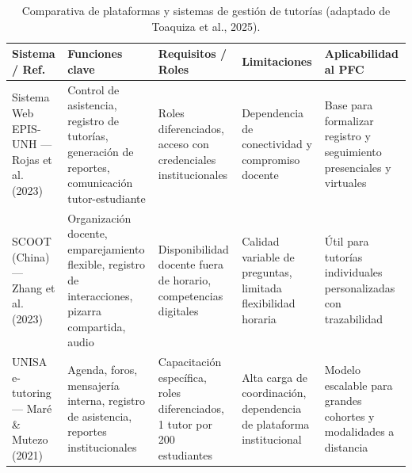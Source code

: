 \documentclass[11pt,a4paper]{article}
\begin{document}
\begin{table}[htbp]
\centering
\caption{Comparativa de plataformas y sistemas de gesti\'on de tutor\'ias (adaptado de Toaquiza et al., 2025).}
\label{tab:comparativasistemas}
\begin{tabularx}{\textwidth}{L{3cm}L{4cm}L{3.4cm}L{3cm}X}
\toprule
{}
\textbf{Sistema / Ref.} & \textbf{Funciones clave} & \textbf{Requisitos / Roles} & \textbf{Limitaciones} & \textbf{Aplicabilidad al PFC}\\
\midrule
Sistema Web EPIS-UNH --- Rojas et al. (2023) & Control de asistencia, registro de tutor\'ias, generaci\'on de reportes, comunicaci\'on tutor-estudiante & Roles diferenciados, acceso con credenciales institucionales & Dependencia de conectividad y compromiso docente & Base para formalizar registro y seguimiento presenciales y virtuales\\
\midrule
SCOOT (China) --- Zhang et al. (2023) & Organizaci\'on docente, emparejamiento flexible, registro de interacciones, pizarra compartida, audio & Disponibilidad docente fuera de horario, competencias digitales & Calidad variable de preguntas, limitada flexibilidad horaria & \'Util para tutor\'ias individuales personalizadas con trazabilidad\\
\midrule
UNISA e-tutoring --- Mar\'e \& Mutezo (2021) & Agenda, foros, mensajer\'ia interna, registro de asistencia, reportes institucionales & Capacitaci\'on espec\'ifica, roles diferenciados, 1 tutor por 200 estudiantes & Alta carga de coordinaci\'on, dependencia de plataforma institucional & Modelo escalable para grandes cohortes y modalidades a distancia\\
\bottomrule
\end{tabularx}
\end{table}
\end{document}
